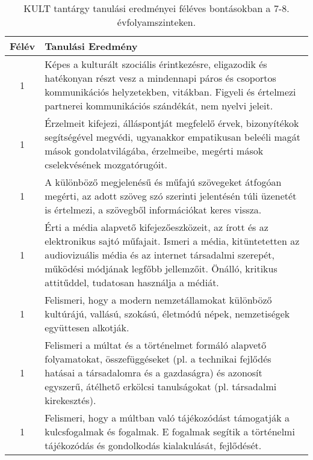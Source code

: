        
           \begin{longtable}{c | p{12cm} }
            \caption[KULT 7-8.]{KULT tantárgy tanulási eredményei féléves bontásokban a 7-8. évfolyamszinteken. }  \\

            \textbf{Félév} & \textbf{Tanulási Eredmény} \\
            \hline
            \endhead
                                
                                      
                                
                                          1 &  Képes a kulturált szociális érintkezésre, eligazodik és hatékonyan részt vesz a mindennapi páros és csoportos kommunikációs helyzetekben, vitákban. Figyeli és értelmezi partnerei kommunikációs szándékát, nem nyelvi jeleit.  \\ \hline
                                          1 &  Érzelmeit kifejezi, álláspontját megfelelő érvek, bizonyítékok segítségével megvédi, ugyanakkor empatikusan beleéli magát mások gondolatvilágába, érzelmeibe, megérti mások cselekvésének mozgatórugóit. \\ \hline
                                          1 &  A különböző megjelenésű és műfajú szövegeket átfogóan megérti, az adott szöveg szó szerinti jelentésén túli üzenetét is értelmezi, a szövegből információkat keres vissza. \\ \hline
                                          1 &  Érti a média alapvető kifejezőeszközeit, az írott és az elektronikus sajtó műfajait. Ismeri a média, kitüntetetten az audiovizuális média és az internet társadalmi szerepét, működési módjának legfőbb jellemzőit. Önálló, kritikus attitűddel, tudatosan használja a médiát. \\ \hline
                                          1 &  Felismeri, hogy a modern nemzetállamokat különböző kultúrájú, vallású, szokású, életmódú népek, nemzetiségek együttesen alkotják. \\ \hline
                                          1 &  Felismeri a múltat és a történelmet formáló alapvető folyamatokat, összefüggéseket (pl. a technikai fejlődés hatásai a társadalomra és a gazdaságra) és azonosít egyszerű, átélhető erkölcsi tanulságokat (pl. társadalmi kirekesztés). \\ \hline
                                          1 &  Felismeri, hogy a múltban való tájékozódást támogatják a kulcsfogalmak és fogalmak. E fogalmak segítik a történelmi tájékozódás és gondolkodás kialakulását, fejlődését. \\ \hline

\end{longtable}
